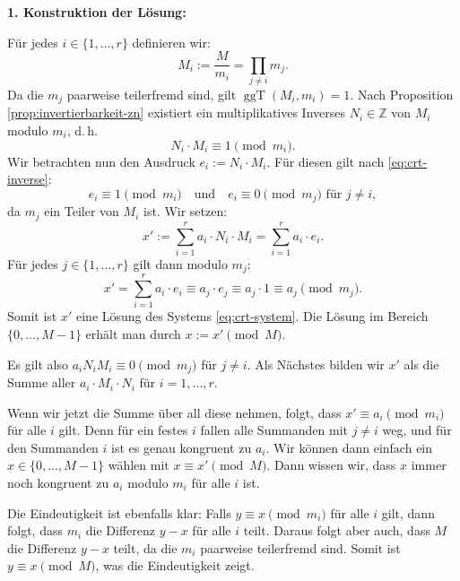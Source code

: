 \begin{math-stroke}
\begin{short-proof}
\textbf{1. Konstruktion der Lösung:}

Für jedes $i \in \{1, \dots, r\}$ definieren wir:
\[
M_i := \frac{M}{m_i} = \prod_{j \neq i} m_j.
\]
Da die $m_j$ paarweise teilerfremd sind, gilt $\operatorname{ggT}(M_i, m_i) = 1$. Nach Proposition \ref{prop:invertierbarkeit-zn} existiert ein multiplikatives Inverses $N_i \in \mathbb{Z}$ von $M_i$ modulo $m_i$, d.\,h.
\begin{equation}\label{eq:crt-inverse}
N_i \cdot M_i \equiv 1 \pmod{m_i}.
\end{equation}
Wir betrachten nun den Ausdruck $e_i := N_i \cdot M_i$. Für diesen gilt nach \eqref{eq:crt-inverse}:
\[
e_i \equiv 1 \pmod{m_i} \quad \text{und} \quad e_i \equiv 0 \pmod{m_j} \text{ für } j \neq i,
\]
da $m_j$ ein Teiler von $M_i$ ist. Wir setzen:
\begin{equation}\label{eq:crt-solution}
x' := \sum_{i=1}^r a_i \cdot N_i \cdot M_i = \sum_{i=1}^r a_i \cdot e_i.
\end{equation}
Für jedes $j \in \{1, \dots, r\}$ gilt dann modulo $m_j$:
\[
x' = \sum_{i=1}^r a_i \cdot e_i \equiv a_j \cdot e_j \equiv a_j \cdot 1 \equiv a_j \pmod{m_j}.
\]
Somit ist $x'$ eine Lösung des Systems \eqref{eq:crt-system}. Die Lösung im Bereich $\{0, \dots, M-1\}$ erhält man durch $x := x' \pmod M$.
\end{short-proof}
\end{math-stroke}

\begin{spoken-clean}[01:09:54 - 01:12:09]
Es gilt also $a_i N_i M_i \equiv 0 \pmod{m_j}$ für $j \neq i$. Als Nächstes bilden wir $x'$ als die Summe aller $a_i \cdot M_i \cdot N_i$ für $i = 1, \dots, r$.

Wenn wir jetzt die Summe über all diese nehmen, folgt, dass $x' \equiv a_i \pmod{m_i}$ für alle $i$ gilt. Denn für ein festes $i$ fallen alle Summanden mit $j \neq i$ weg, und für den Summanden $i$ ist es genau kongruent zu $a_i$. Wir können dann einfach ein $x \in \{0, \dots, M-1\}$ wählen mit $x \equiv x' \pmod M$. Dann wissen wir, dass $x$ immer noch kongruent zu $a_i$ modulo $m_i$ für alle $i$ ist.

Die Eindeutigkeit ist ebenfalls klar: Falls $y \equiv x \pmod{m_i}$ für alle $i$ gilt, dann folgt, dass $m_i$ die Differenz $y - x$ für alle $i$ teilt. Daraus folgt aber auch, dass $M$ die Differenz $y - x$ teilt, da die $m_i$ paarweise teilerfremd sind. Somit ist $y \equiv x \pmod M$, was die Eindeutigkeit zeigt.
\end{spoken-clean}


